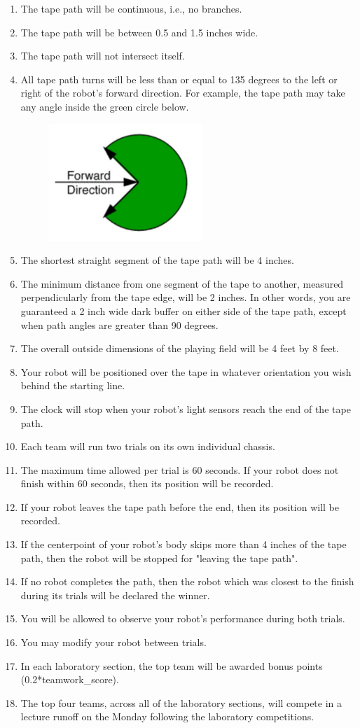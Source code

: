 \begin{enumerate}
	\item The tape path will be continuous, i.e., no branches.
	\item The tape path will be between 0.5 and 1.5 inches wide.
	\item The tape path will not intersect itself.
	\item All tape path turns will be less than or equal to 135 degrees to the left or right of the robot's forward direction. For example, the tape path may take any angle inside the green circle below.
	\begin{figure}[h]
		\centering
		\includegraphics[width=0.2\linewidth]{figure01}
		\caption{}
		\label{fig:figure01}
	\end{figure}
	
	\item The shortest straight segment of the tape path will be 4 inches.
	\item The minimum distance from one segment of the tape to another, measured perpendicularly from the tape edge, will be 2 inches. In other words, you are guaranteed a 2 inch wide dark buffer on either side of the tape path, except when path angles are greater than 90 degrees. 
	\item The overall outside dimensions of the playing field will be 4 feet by 8 feet.
	\item Your robot will be positioned over the tape in whatever orientation you wish behind the starting line.
	\item The clock will stop when your robot's light sensors reach the end of the tape path.
	\item Each team will run two trials on its own individual chassis.
	\item The maximum time allowed per trial is 60 seconds. If your robot does not finish within 60 seconds, then its position will be recorded.
	\item If your robot leaves the tape path before the end, then its position will be recorded.
	\item If the centerpoint of your robot's body skips more than 4 inches of the tape path, then the robot will be stopped for "leaving the tape path".
	\item If no robot completes the path, then the robot which was closest to the finish during its trials will be declared the winner.
	\item You will be allowed to observe your robot's performance during both trials.
	\item You may modify your robot between trials.
	\item In each laboratory section, the top team will be awarded bonus points (0.2*teamwork\_score).
	\item The top four teams, across all of the laboratory sections, will compete in a lecture runoff on the Monday following the laboratory competitions.
	
\end{enumerate}
